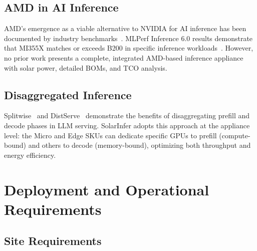 \documentclass[conference,10pt,letterpaper]{IEEEtran}
\begin{document}
\subsection{AMD in AI Inference}

AMD's emergence as a viable alternative to NVIDIA for AI inference has been documented by industry benchmarks~\cite{amd2024mi300x}. MLPerf Inference 6.0 results demonstrate that MI355X matches or exceeds B200 in specific inference workloads~\cite{amd2024mi300x}. However, no prior work presents a complete, integrated AMD-based inference appliance with solar power, detailed BOMs, and TCO analysis.

\subsection{Disaggregated Inference}

Splitwise~\cite{patel2024splitwise} and DistServe~\cite{zhong2024distserve} demonstrate the benefits of disaggregating prefill and decode phases in LLM serving. SolarInfer adopts this approach at the appliance level: the Micro and Edge SKUs can dedicate specific GPUs to prefill (compute-bound) and others to decode (memory-bound), optimizing both throughput and energy efficiency.

\section{Deployment and Operational Requirements}
\label{sec:deployment}

\subsection{Site Requirements}

\begin{table}[!t]
\caption{Site Requirements by SKU}
\label{tab:sitereq}
\centering\scriptsize
{}
\end{table}
\end{document}
